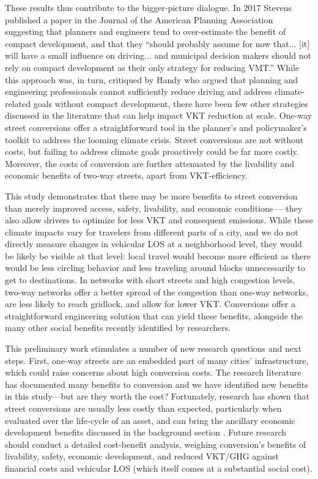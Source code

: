 \documentclass{trbunofficial}
\begin{document}
These results thus contribute to the bigger-picture dialogue. In 2017 Stevens \cite{stevens_does_2017} published a paper in the Journal of the American Planning Association suggesting that planners and engineers tend to over-estimate the benefit of compact development, and that they \enquote{should probably assume for now that... [it] will have a small influence on driving... and municipal decision makers should not rely on compact development as their only strategy for reducing VMT.} While this approach was, in turn, critiqued by Handy \cite{handy_thoughts_2017} who argued that planning and engineering professionals cannot sufficiently reduce driving and address climate-related goals without compact development, there have been few other strategies discussed in the literature that can help impact VKT reduction at scale. One-way street conversions offer a straightforward tool in the planner's and policymaker's toolkit to address the looming climate crisis. Street conversions are not without costs, but failing to address climate goals proactively could be far more costly. Moreover, the costs of conversion are further attenuated by the livability and economic benefits of two-way streets, apart from VKT-efficiency.

This study demonstrates that there may be more benefits to street conversion than merely improved access, safety, livability, and economic conditions--—they also allow drivers to optimize for less VKT and consequent emissions. While these climate impacts vary for travelers from different parts of a city, and we do not directly measure changes in vehicular LOS at a neighborhood level, they would be likely be visible at that level: local travel would become more efficient as there would be less circling behavior and less traveling around blocks unnecessarily to get to destinations. In networks with short streets and high congestion levels, two-way networks offer a better spread of the congestion than one-way networks, are less likely to reach gridlock, and allow for lower VKT. Conversions offer a straightforward engineering solution that can yield these benefits, alongside the many other social benefits recently identified by researchers.

This preliminary work stimulates a number of new research questions and next steps. First, one-way streets are an embedded part of many cities' infrastructure, which could raise concerns about high conversion costs. The research literature has documented many benefits to conversion and we have identified new benefits in this study---but are they worth the cost? Fortunately, research has shown that street conversions are usually less costly than expected, particularly when evaluated over the life-cycle of an asset, and can bring the ancillary economic development benefits discussed in the background section \cite{speck_walkable_2018,riggs_two-way_2016,steuteville_cities_2019,noland_costs_2015}. Future research should conduct a detailed cost-benefit analysis, weighing conversion's benefits of livability, safety, economic development, and reduced VKT/GHG against financial costs and vehicular LOS (which itself comes at a substantial social cost).
\end{document}
